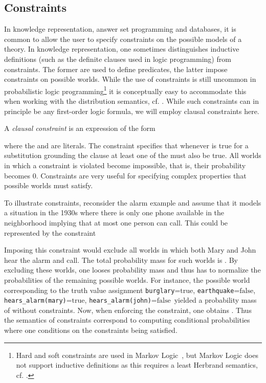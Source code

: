 \documentclass[a4paper]{article}
\newcommand{\true}{\ensuremath{\mathrm{true}}}
\newcommand{\false}{\ensuremath{\mathrm{false}}}
\begin{document}
\subsection{Constraints}
In knowledge representation, answer set programming and databases, it is common to allow the user to 
specify constraints on the possible models of a theory.  
In knowledge representation, one sometimes distinguishes inductive definitions (such as the 
definite clauses used in logic programming) from constraints.
The former are used to define predicates, the latter impose constraints on possible worlds. 
While the use of constraints is still uncommon in probabilistic logic programming\footnote{Hard   
and soft constraints are used in Markov Logic~\citep{Richardson:06},
but Markov Logic does not support inductive definitions as this requires a least Herbrand semantics, cf. \cite{FierensNIPS12}.
}
it is conceptually easy to accommodate this when working with the distribution semantics, cf. \cite{FierensNIPS12}.
While such constraints can in principle be any first-order logic formula, we will employ clausal constraints here.

A \emph{clausal constraint} is an expression of the form 

where the  and  are literals. The constraint specifies that whenever  is true
for a substitution  grounding the clause at least one of the  must also be true. 
All worlds in which a constraint is violated become impossible, that is, their probability becomes 0.
Constraints are very useful for specifying complex properties that 
possible worlds must satisfy. 

To illustrate constraints, reconsider the alarm example and assume that it models a situation in the 1930s where there 
is only one phone available in the neighborhood implying that at most one person can call. This could be represented by the constraint

Imposing this constraint would exclude all worlds in which both Mary and John hear the alarm and call. 
The total probability mass for such worlds is . By excluding these worlds, one looses 
probability mass and thus has to normalize the probabilities of the remaining possible worlds. 
For instance, the possible world corresponding to the truth
value assignment \verb|burglary|=\true, \verb|earthquake|=\false,
\verb|hears_alarm(mary)|=\true, \verb|hears_alarm(john)|=\false\  
yielded a probability mass of 
 without constraints. 
Now, when enforcing the constraint, one obtains .
Thus the semantics of constraints correspond to computing conditional probabilities where one conditions
on the constraints being satisfied. 
\end{document}
